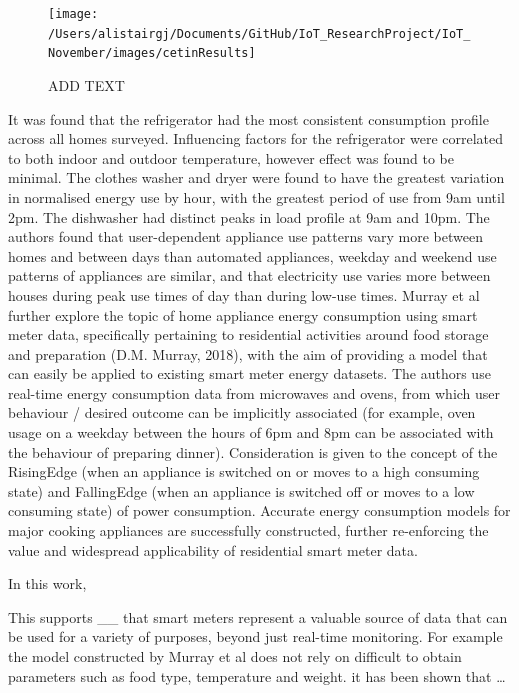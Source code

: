 \documentclass[11pt,]{article}
\begin{document}
\begin{figure}[H]

{\centering \texttt{[image: /Users/alistairgj/Documents/GitHub/IoT\_ResearchProject/IoT\_November/images/cetinResults]} 

}

\caption{ADD TEXT}\label{fig:unnamed-chunk-4}
\end{figure}

It was found that the refrigerator had the most consistent consumption
profile across all homes surveyed. Influencing factors for the
refrigerator were correlated to both indoor and outdoor temperature,
however effect was found to be minimal. The clothes washer and dryer
were found to have the greatest variation in normalised energy use by
hour, with the greatest period of use from 9am until 2pm. The dishwasher
had distinct peaks in load profile at 9am and 10pm. The authors found
that user-dependent appliance use patterns vary more between homes and
between days than automated appliances, weekday and weekend use patterns
of appliances are similar, and that electricity use varies more between
houses during peak use times of day than during low-use times. Murray et
al further explore the topic of home appliance energy consumption using
smart meter data, specifically pertaining to residential activities
around food storage and preparation (D.M. Murray, 2018), with the aim of
providing a model that can easily be applied to existing smart meter
energy datasets. The authors use real-time energy consumption data from
microwaves and ovens, from which user behaviour / desired outcome can be
implicitly associated (for example, oven usage on a weekday between the
hours of 6pm and 8pm can be associated with the behaviour of preparing
dinner). Consideration is given to the concept of the RisingEdge (when
an appliance is switched on or moves to a high consuming state) and
FallingEdge (when an appliance is switched off or moves to a low
consuming state) of power consumption. Accurate energy consumption
models for major cooking appliances are successfully constructed,
further re-enforcing the value and widespread applicability of
residential smart meter data.

In this work,

This supports \_\_ that smart meters represent a valuable source of data
that can be used for a variety of purposes, beyond just real-time
monitoring. For example the model constructed by Murray et al does not
rely on difficult to obtain parameters such as food type, temperature
and weight. it has been shown that \ldots{}
\end{document}
